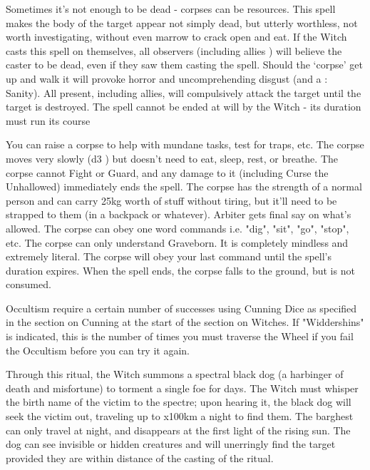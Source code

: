 {\NECRO[
  Name=Worthless Corpse,
  Link=necromancy-worthless-corpse,
  Paradigm=Death,
  Save=N,
  Duration=Session,
  Mod=+0,
  Keywords=None,
  Target=Close (touch) Mortal corpse
]


Sometimes it's not enough to be dead - corpses can be resources. This spell makes the body of the target appear not simply dead, but utterly worthless, not worth investigating, without even marrow to crack open and eat. If the Witch casts this spell on themselves, all observers (including allies ) will believe the caster to be dead, even if they saw them casting the spell. Should the ‘corpse’ get up and walk it will provoke horror and uncomprehending disgust (and a \RS: Sanity). All present, including allies, will compulsively attack the target until the target is destroyed.  The spell cannot be ended at will by the Witch - its duration must run its course

\NECRO[
  Name=Zombie Slave,
  Link=necromancy-zombie-slave,
  Paradigm=Death,
  Save=N,
  Duration=Session,
  Mod=+0,
  Keywords=None,
  Target=Close (touch) corpse
]


You can raise a corpse to help with mundane tasks, test for traps, etc.  The corpse moves very slowly (d3 \MD) but doesn't need to eat, sleep, rest, or breathe.  The corpse cannot Fight or Guard, and any damage to it (including Curse the Unhallowed) immediately ends the spell.  The corpse has the strength of a normal person and can carry 25kg worth of stuff without tiring, but it'll need to be strapped to them (in a backpack or whatever).  Arbiter gets final say on what's allowed. The corpse can obey one word commands i.e. "dig", "sit", "go", "stop", etc.  The corpse can only understand Graveborn. It is completely mindless and extremely literal. The corpse will obey your last command until the spell's duration expires.  When the spell ends, the corpse falls to the ground, but is not consumed.

\newpage


Occultism require a certain number of successes using Cunning Dice as specified in the section on Cunning at the start of the section on Witches.  If "Widdershins" is indicated, this is the number of times you must traverse the Wheel if you fail the Occultism before you can try it again.

\OCCULT[
  Name=Barghest,
  Link=occultism-barghest,
  Success=4,
  Cost=See below,
  Widdershins=1
]

Through this ritual, the Witch summons a spectral black dog (a harbinger of death and misfortune) to torment a single foe for \LVL days.  The Witch must whisper the birth name of the victim to the spectre; upon hearing it, the black dog will seek the victim out, traveling up to \LVL x100km a night to find them.  The barghest can only travel at night, and disappears at the first light of the rising sun.  The dog can see invisible or hidden creatures and will unerringly find the target provided they are within distance of the casting of the ritual.

}
